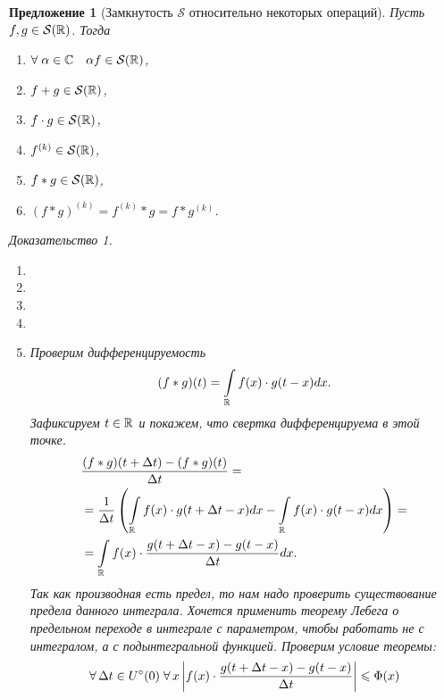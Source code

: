 \documentclass[a5paper, 10pt]{article}
\theoremstyle{definition}
\theoremstyle{plain}
\newtheorem*{Prop}{Предложение}
\theoremstyle{remark}
\newtheorem*{Proof}{Доказательство}
\begin{document}
    \begin{Prop}[Замкнутость $\mathcal{S}$ относительно некоторых операций]
        Пусть $f,g \in \mathcal{S}(\mathbb{R})$. Тогда
        \begin{enumerate}
            \item $\forall\; \alpha\in \mathbb{C} \quad \alpha f \in \mathcal{S}(\mathbb{R})$,
            \item  $f + g \in \mathcal{S}(\mathbb{R})$,
            \item  $f \cdot g \in \mathcal{S}(\mathbb{R})$,
            \item $f^{(k)} \in \mathcal{S}(\mathbb{R})$,
            \item $f * g \in \mathcal{S}(\mathbb{R})$,
            \item[$\star$] $(f*g)^{(k)} = f^{(k)} * g = f * g^{(k)}$.
        \end{enumerate}
        \begin{Proof}
            \begin{enumerate}
                \item
                \item
                \item
                \item
                \item Проверим дифференцируемость
                    \[
                        (f*g)(t) = \int\limits_{\mathbb{R}} f(x) \cdot g(t-x) dx.
                    \] 
                    Зафиксируем $t\in \mathbb{R}$ и покажем, что свертка дифференцируема в этой точке.
                    \[
                        \begin{split}
                        &\frac{(f*g)(t+\Delta t) - (f*g)(t)}{\Delta t} =\\
                        &= \frac1{\Delta t} \left(\int\limits_{\mathbb{R}} f(x) \cdot g(t+\Delta t-x) dx -\int\limits_{\mathbb{R}} f(x) \cdot g(t-x) dx\right) =\\
                        &= \int\limits_{\mathbb{R}} f(x)\cdot  \frac{g(t+\Delta t- x) - g(t-x)}{\Delta t} dx.
                        \end{split}
                    \] 
                    Так как производная есть предел, то нам надо проверить существование предела данного интеграла. Хочется применить теорему Лебега о предельном переходе в интеграле с параметром, чтобы работать не с интегралом, а с подынтегральной функцией. Проверим условие теоремы:
                    \[
                        \forall \, \Delta t \in U^{\circ} (0) \; \forall \, x \left|f(x) \cdot \frac{g(t+\Delta t- x) - g(t-x)}{\Delta t} \right| \leqslant \Phi(x)
\]
\end{enumerate}
\end{Proof}
\end{Prop}
\end{document}
